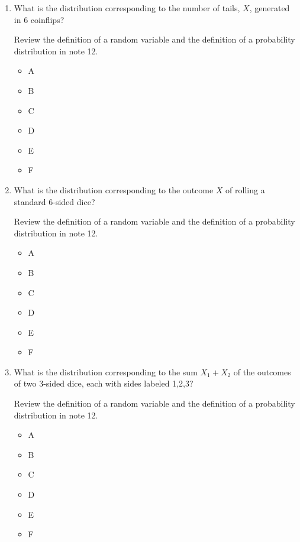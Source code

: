 \documentclass[11pt, preview]{standalone} %
\begin{document}
\begin{enumerate}
\begin{enumerate}
\item What is the distribution corresponding to the number of tails, $X$, generated in 6 coinflips?
\begin{Multi}
Review the definition of a random variable and the definition of a probability distribution in note 12.
\begin{itemize}
\FalseChoice\item A
\TrueChoice\item B
\FalseChoice\item C
\FalseChoice\item D
\FalseChoice\item E
\FalseChoice\item F
\end{itemize}
\end{Multi}
\item  What is the distribution corresponding to the outcome $X$ of rolling a standard 6-sided dice?
\begin{Multi}
Review the definition of a random variable and the definition of a probability distribution in note 12.
\begin{itemize}
\FalseChoice\item A
\FalseChoice\item B
\TrueChoice\item C
\FalseChoice\item D
\FalseChoice\item E
\FalseChoice\item F
\end{itemize}
\end{Multi}
\item What is the distribution corresponding to the sum $X_1 + X_2$ of the outcomes of two 3-sided dice, each with sides labeled 1,2,3?
\begin{Multi}
Review the definition of a random variable and the definition of a probability distribution in note 12.
\begin{itemize}
\FalseChoice\item A
\FalseChoice\item B
\FalseChoice\item C
\FalseChoice\item D
\TrueChoice\item E
\FalseChoice\item F
\end{itemize}

\end{Multi}
\end{enumerate}
\end{enumerate}
\end{document}
